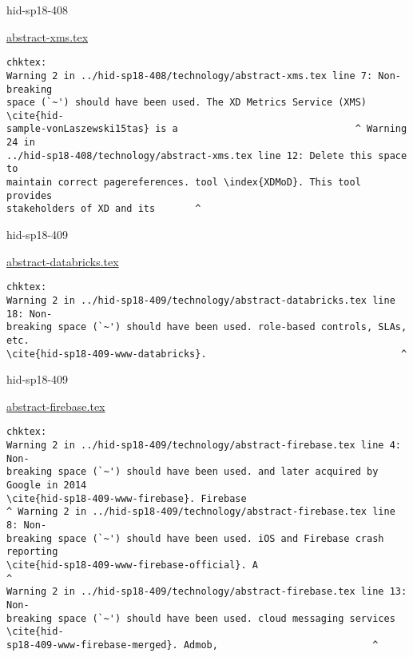 \begin{IU}

hid-sp18-408

\href{https://github.com/cloudmesh-community/hid-sp18-408/blob/master//technology/abstract-xms.tex}{abstract-xms.tex}

\begin{tiny}
\begin{verbatim}
chktex:
Warning 2 in ../hid-sp18-408/technology/abstract-xms.tex line 7: Non-breaking
space (`~') should have been used. The XD Metrics Service (XMS) \cite{hid-
sample-vonLaszewski15tas} is a                               ^ Warning 24 in
../hid-sp18-408/technology/abstract-xms.tex line 12: Delete this space to
maintain correct pagereferences. tool \index{XDMoD}. This tool provides
stakeholders of XD and its       ^
\end{verbatim}
\end{tiny}
\end{IU}



\begin{IU}

hid-sp18-409

\href{https://github.com/cloudmesh-community/hid-sp18-409/blob/master//technology/abstract-databricks.tex}{abstract-databricks.tex}

\begin{tiny}
\begin{verbatim}
chktex:
Warning 2 in ../hid-sp18-409/technology/abstract-databricks.tex line 18: Non-
breaking space (`~') should have been used. role-based controls, SLAs, etc.
\cite{hid-sp18-409-www-databricks}.                                  ^
\end{verbatim}
\end{tiny}
\end{IU}



\begin{IU}

hid-sp18-409

\href{https://github.com/cloudmesh-community/hid-sp18-409/blob/master//technology/abstract-firebase.tex}{abstract-firebase.tex}

\begin{tiny}
\begin{verbatim}
chktex:
Warning 2 in ../hid-sp18-409/technology/abstract-firebase.tex line 4: Non-
breaking space (`~') should have been used. and later acquired by Google in 2014
\cite{hid-sp18-409-www-firebase}. Firebase
^ Warning 2 in ../hid-sp18-409/technology/abstract-firebase.tex line 8: Non-
breaking space (`~') should have been used. iOS and Firebase crash reporting
\cite{hid-sp18-409-www-firebase-official}. A                                   ^
Warning 2 in ../hid-sp18-409/technology/abstract-firebase.tex line 13: Non-
breaking space (`~') should have been used. cloud messaging services \cite{hid-
sp18-409-www-firebase-merged}. Admob,                           ^
\end{verbatim}
\end{tiny}
\end{IU}

